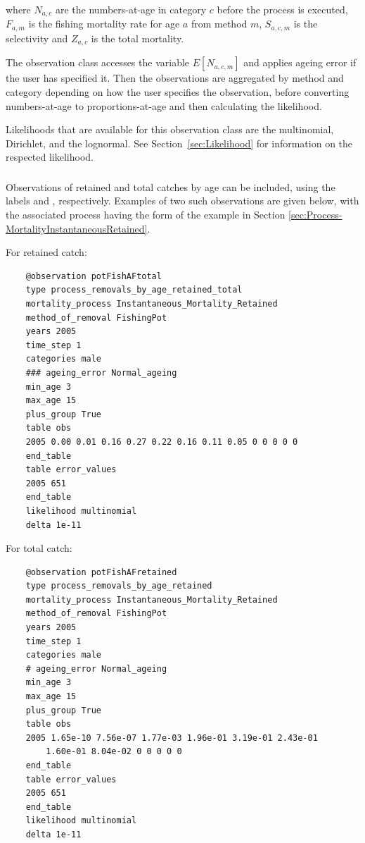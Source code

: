 where $N_{a,c}$ are the numbers-at-age in category $c$ before the process is executed, $F_{a,m}$ is the fishing mortality rate for age $a$ from method $m$, $S_{a,c,m}$ is the selectivity and $Z_{a,c}$ is the total mortality.

The observation class accesses the variable $E[N_{a,c,m}]$ and applies ageing error if the user has specified it. Then the observations are aggregated by method and category depending on how the user specifies the observation, before converting numbers-at-age to proportions-at-age and then calculating the likelihood.

Likelihoods that are available for this observation class are the multinomial, Dirichlet, and the lognormal. See Section~\ref{sec:Likelihood} for information on the respected likelihood.

\subsubsection{ \label{sec:Observation-ProcessRemovalsByAgeRetained} \label{sec:Observation-ProcessRemovalsByAgeRetainedTotal}}

Observations of retained and total catches by age can be included, using the labels  and , respectively. Examples of two such observations are given below, with the associated process  having the form of the example in Section \ref{sec:Process-MortalityInstantaneousRetained}.

For retained catch:

{\small{\begin{verbatim}
	@observation potFishAFtotal
	type process_removals_by_age_retained_total
	mortality_process Instantaneous_Mortality_Retained
	method_of_removal FishingPot
	years 2005
	time_step 1
	categories male
	### ageing_error Normal_ageing
	min_age 3
	max_age 15
	plus_group True
	table obs
	2005 0.00 0.01 0.16 0.27 0.22 0.16 0.11 0.05 0 0 0 0 0
	end_table
	table error_values
	2005 651
	end_table
	likelihood multinomial
	delta 1e-11
\end{verbatim}}}

For total catch:

{\small{\begin{verbatim}
	@observation potFishAFretained
	type process_removals_by_age_retained
	mortality_process Instantaneous_Mortality_Retained
	method_of_removal FishingPot
	years 2005
	time_step 1
	categories male
	# ageing_error Normal_ageing
	min_age 3
	max_age 15
	plus_group True
	table obs
	2005 1.65e-10 7.56e-07 1.77e-03 1.96e-01 3.19e-01 2.43e-01 
		1.60e-01 8.04e-02 0 0 0 0 0
	end_table
	table error_values
	2005 651
	end_table
	likelihood multinomial
	delta 1e-11
\end{verbatim}}}

